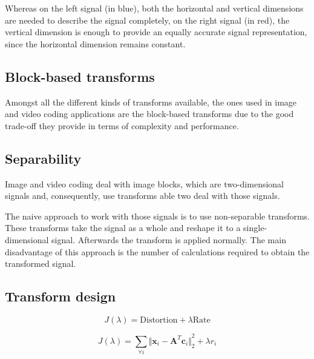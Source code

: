 \documentclass[11pt,a4paper,openright,twoside]{book}
\numberwithin{equation}{section} %
\begin{document}
Whereas on the left signal (in blue), both the horizontal and vertical
dimensions are needed to describe the signal completely, on the right
signal (in red), the vertical dimension is enough to provide an equally
accurate signal representation, since the horizontal dimension remains
constant.

\subsection{Block-based transforms}
\label{sub:block_based_transforms}

Amongst all the different kinds of transforms available, the ones used
in image and video coding applications are the block-based transforms
due to the good trade-off they provide in terms of complexity and
performance.

\subsection{Separability}
\label{sub:separability}

Image and video coding deal with image blocks, which are two-dimensional
signals and, consequently, use transforms able two deal with those
signals.

The naive approach to work with those signals is to use non-separable
transforms.
These transforms take the signal as a whole and reshape it to a
single-dimensional signal.
Afterwards the transform is applied normally.
The main disadvantage of this approach is the number of calculations
required to obtain the transformed signal.

\subsection{Transform design}
\label{sub:transform_design}

\def\A{\mathbf{A}}
\def\I{\mathbf{I}}
\def\P{\text{P}}
\def\U{\mathbf{U}}
\def\V{\mathbf{V}}
\def\X{\mathbf{X}}
\def\Y{\mathbf{Y}}
\def\arg{\text{arg}}
\def\c{\mathbf{c}}
\def\d{\text{d}}
\def\e{\text{e}}
\def\GGD{\text{GGD}}
\def\tr{\text{tr}}
\def\x{\mathbf{x}}
\def\Lambdab{\contour[3]{black}{$\Lambda$}}

\begin{equation}
	J(\lambda) = \text{Distortion} + \lambda \text{Rate}
\end{equation}

\begin{equation}
	J(\lambda) = \sum\limits_{\forall i}{\Vert \x_i - \A^T \c_i \Vert}_2^2
	+ \lambda r_i
\end{equation}
\end{document}
